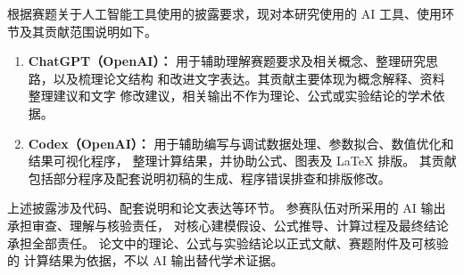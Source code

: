 \documentclass[bwprint]{gmcmthesis}
\numberwithin{equation}{section}
\numberwithin{figure}{section}
\numberwithin{table}{section}
\begin{document}
    根据赛题关于人工智能工具使用的披露要求，现对本研究使用的
    AI 工具、使用环节及其贡献范围说明如下。

    \begin{enumerate}
        \item \textbf{ChatGPT（OpenAI）：}
        用于辅助理解赛题要求及相关概念、整理研究思路，以及梳理论文结构
        和改进文字表达。其贡献主要体现为概念解释、资料整理建议和文字
        修改建议，相关输出不作为理论、公式或实验结论的学术依据。
    
        \item \textbf{Codex（OpenAI）：}
        用于辅助编写与调试数据处理、参数拟合、数值优化和结果可视化程序，
        整理计算结果，并协助公式、图表及 \LaTeX{} 排版。
        其贡献包括部分程序及配套说明初稿的生成、程序错误排查和排版修改。
    \end{enumerate}
    
    上述披露涉及代码、配套说明和论文表达等环节。
    参赛队伍对所采用的 AI 输出承担审查、理解与核验责任，
    对核心建模假设、公式推导、计算过程及最终结论承担全部责任。
    论文中的理论、公式与实验结论以正式文献、赛题附件及可核验的
    计算结果为依据，不以 AI 输出替代学术证据。
\end{document}
